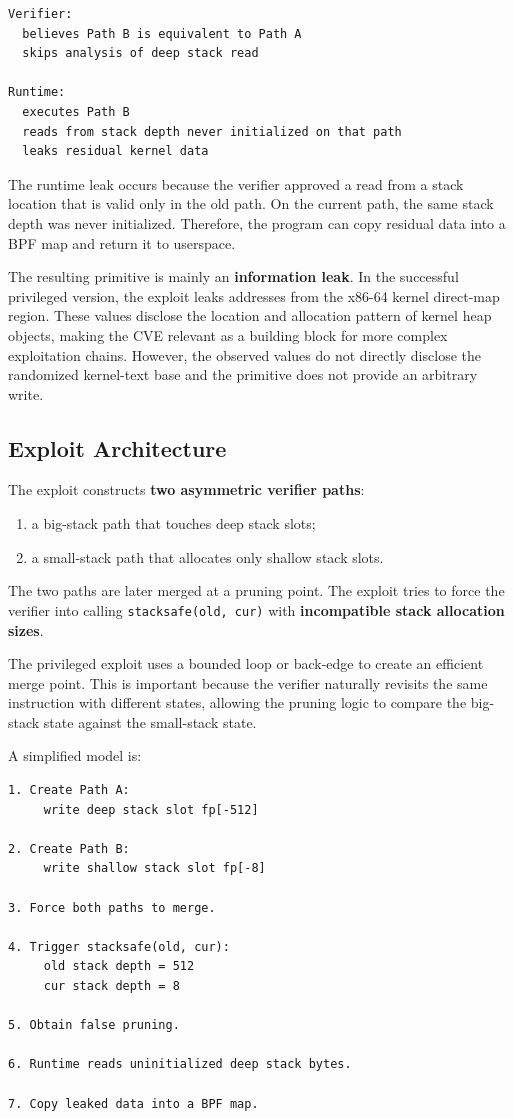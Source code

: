 \documentclass[../main.tex]{subfiles}
\begin{document}
\begin{lstlisting}[caption={False pruning effect.}]
Verifier:
  believes Path B is equivalent to Path A
  skips analysis of deep stack read

Runtime:
  executes Path B
  reads from stack depth never initialized on that path
  leaks residual kernel data
\end{lstlisting}

The runtime leak occurs because the verifier approved a read from a stack location that is valid only in the old path. On the current path, the same stack depth was never initialized. Therefore, the program can copy residual data into a BPF map and return it to userspace.

The resulting primitive is mainly an \textbf{information leak}. In the successful privileged version, the exploit leaks addresses from the x86-64 kernel direct-map region. These values disclose the location and allocation pattern of kernel heap objects, making the CVE relevant as a building block for more complex exploitation chains. However, the observed values do not directly disclose the randomized kernel-text base and the primitive does not provide an arbitrary write.

\subsection{Exploit Architecture}

The exploit constructs \textbf{two asymmetric verifier paths}:

\begin{enumerate}
    \item a big-stack path that touches deep stack slots;
    \item a small-stack path that allocates only shallow stack slots.
\end{enumerate}

The two paths are later merged at a pruning point. The exploit tries to force the verifier into calling \texttt{stacksafe(old, cur)} with \textbf{incompatible stack allocation sizes}.

The privileged exploit uses a bounded loop or back-edge to create an efficient merge point. This is important because the verifier naturally revisits the same instruction with different states, allowing the pruning logic to compare the big-stack state against the small-stack state.

A simplified model is:

\begin{lstlisting}[caption={High-level exploit model.}]
1. Create Path A:
     write deep stack slot fp[-512]

2. Create Path B:
     write shallow stack slot fp[-8]

3. Force both paths to merge.

4. Trigger stacksafe(old, cur):
     old stack depth = 512
     cur stack depth = 8

5. Obtain false pruning.

6. Runtime reads uninitialized deep stack bytes.

7. Copy leaked data into a BPF map.
\end{lstlisting}
\end{document}
